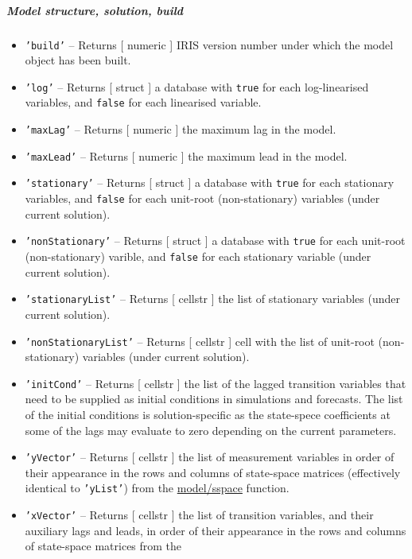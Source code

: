  \subparagraph{Model structure, solution, build}
 
 \begin{itemize}
 \item
   \texttt{'build'} -- Returns {[} numeric {]} IRIS version number under
   which the model object has been built.
 \item
   \texttt{'log'} -- Returns {[} struct {]} a database with \texttt{true}
   for each log-linearised variables, and \texttt{false} for each
   linearised variable.
 \item
   \texttt{'maxLag'} -- Returns {[} numeric {]} the maximum lag in the
   model.
 \item
   \texttt{'maxLead'} -- Returns {[} numeric {]} the maximum lead in the
   model.
 \item
   \texttt{'stationary'} -- Returns {[} struct {]} a database with
   \texttt{true} for each stationary variables, and \texttt{false} for
   each unit-root (non-stationary) variables (under current solution).
 \item
   \texttt{'nonStationary'} -- Returns {[} struct {]} a database with
   \texttt{true} for each unit-root (non-stationary) varible, and
   \texttt{false} for each stationary variable (under current solution).
 \item
   \texttt{'stationaryList'} -- Returns {[} cellstr {]} the list of
   stationary variables (under current solution).
 \item
   \texttt{'nonStationaryList'} -- Returns {[} cellstr {]} cell with the
   list of unit-root (non-stationary) variables (under current solution).
 \item
   \texttt{'initCond'} -- Returns {[} cellstr {]} the list of the lagged
   transition variables that need to be supplied as initial conditions in
   simulations and forecasts. The list of the initial conditions is
   solution-specific as the state-spece coefficients at some of the lags
   may evaluate to zero depending on the current parameters.
 \item
   \texttt{'yVector'} -- Returns {[} cellstr {]} the list of measurement
   variables in order of their appearance in the rows and columns of
   state-space matrices (effectively identical to \texttt{'yList'}) from
   the \url{model/sspace} function.
 \item
   \texttt{'xVector'} -- Returns {[} cellstr {]} the list of transition
   variables, and their auxiliary lags and leads, in order of their
   appearance in the rows and columns of state-space matrices from the

\end{itemize}
